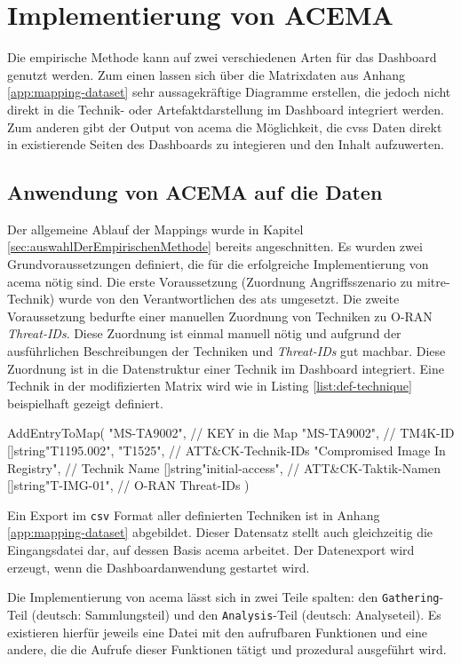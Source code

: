 \section{Implementierung von ACEMA}
Die empirische Methode kann auf zwei verschiedenen Arten für das Dashboard genutzt werden. Zum einen lassen sich über die Matrixdaten aus Anhang \ref{app:mapping-dataset} sehr aussagekräftige Diagramme erstellen, die jedoch nicht direkt in die Technik- oder Artefaktdarstellung im Dashboard integriert werden. Zum anderen gibt der Output von \gls{acema} die Möglichkeit, die \gls{cvss} Daten direkt in existierende Seiten des Dashboards zu integieren und den Inhalt aufzuwerten.

\subsection{Anwendung von ACEMA auf die Daten}
\label{sec:impl-anwendungVonAcema}
Der allgemeine Ablauf der Mappings wurde in Kapitel \ref{sec:auswahlDerEmpirischenMethode} bereits angeschnitten. Es wurden zwei Grundvoraussetzungen definiert, die für die erfolgreiche Implementierung von \gls{acema} nötig sind. Die erste Voraussetzung (Zuordnung Angriffsszenario zu \gls{mitre}-Technik) wurde von den Verantwortlichen des \glspl{at} umgesetzt. Die zweite Voraussetzung bedurfte einer manuellen Zuordnung von Techniken zu O-RAN \textit{Threat-IDs}. Diese Zuordnung ist einmal manuell nötig und aufgrund der ausführlichen Beschreibungen der Techniken und \textit{Threat-IDs} gut machbar. Diese Zuordnung ist in die Datenstruktur einer Technik im Dashboard integriert. Eine Technik in der modifizierten Matrix wird wie in Listing \ref{list:def-technique} beispielhaft gezeigt definiert.
\begin{code}[caption=Beispielhafte Definition einer Technik im Dashboard, label={list:def-technique}]
    AddEntryToMap(
        "MS-TA9002",                        // KEY in die Map
        "MS-TA9002",                        // TM4K-ID
        []string{"T1195.002", "T1525"},     // ATT&CK-Technik-IDs
        "Compromised Image In Registry",    // Technik Name
        []string{"initial-access"},         // ATT&CK-Taktik-Namen
        []string{"T-IMG-01"},               // O-RAN Threat-IDs
    )
\end{code}

Ein Export im \verb|csv| Format aller definierten Techniken ist in Anhang \ref{app:mapping-dataset} abgebildet. Dieser Datensatz stellt auch gleichzeitig die Eingangsdatei dar, auf dessen Basis \gls{acema} arbeitet. Der Datenexport wird erzeugt, wenn die Dashboardanwendung gestartet wird.
\par Die Implementierung von \gls{acema} lässt sich in zwei Teile spalten: den \verb|Gathering|-Teil (deutsch: Sammlungsteil) und den \verb|Analysis|-Teil (deutsch: Analyseteil). Es existieren hierfür jeweils eine Datei mit den aufrufbaren Funktionen und eine andere, die die Aufrufe dieser Funktionen tätigt und prozedural ausgeführt wird.


